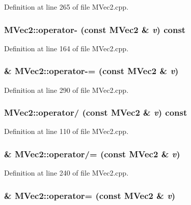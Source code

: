 Definition at line 265 of file MVec2.cpp.\hypertarget{class_m_vec2_3ebc8a2ec5fddfb03ae70b8b5eba372e}{
\subsubsection[{operator-}]{ MVec2::operator- (const {\bf MVec2} \& {\em v}) const}}
\label{class_m_vec2_3ebc8a2ec5fddfb03ae70b8b5eba372e}




Definition at line 164 of file MVec2.cpp.\hypertarget{class_m_vec2_1416f1bb81777c79c96a7b3218c37dfe}{
\subsubsection[{operator-=}]{ \& MVec2::operator-= (const {\bf MVec2} \& {\em v})}}
\label{class_m_vec2_1416f1bb81777c79c96a7b3218c37dfe}




Definition at line 290 of file MVec2.cpp.\hypertarget{class_m_vec2_a0a8d73a0d2df28d54330b8b8709499b}{
\subsubsection[{operator/}]{ MVec2::operator/ (const {\bf MVec2} \& {\em v}) const}}
\label{class_m_vec2_a0a8d73a0d2df28d54330b8b8709499b}




Definition at line 110 of file MVec2.cpp.\hypertarget{class_m_vec2_8d7dfb8881c4acce91b1143471f0abce}{
\subsubsection[{operator/=}]{ \& MVec2::operator/= (const {\bf MVec2} \& {\em v})}}
\label{class_m_vec2_8d7dfb8881c4acce91b1143471f0abce}




Definition at line 240 of file MVec2.cpp.\hypertarget{class_m_vec2_a41defbde5254e59214c985f922426c2}{
\subsubsection[{operator=}]{ \& MVec2::operator= (const {\bf MVec2} \& {\em v})}}
\label{class_m_vec2_a41defbde5254e59214c985f922426c2}




